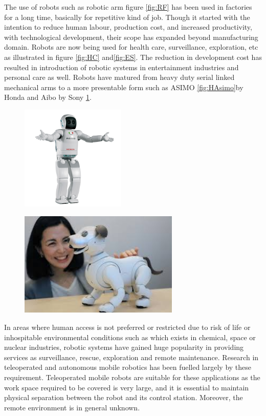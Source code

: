 The use of robots such as robotic arm figure \ref{fig:RF} has been used in factories for a long time, basically for repetitive kind  of job. Though it started with the intention to reduce human labour, production cost, and increased productivity, with technological development,  their scope has expanded beyond  manufacturing domain. Robots are now being used for health care, surveillance, exploration, etc as illustrated in figure \ref{fig:HC} and\ref{fig:ES}. The reduction in development cost  has resulted in introduction of robotic systems in entertainment industries and personal care as well. Robots have matured from heavy duty serial linked mechanical arms to a more presentable form such as ASIMO \ref{fig:HAsimo}by Honda and Aibo by Sony \ref{fig:SA}.  
\begin{figure}
	\centering
	\begin{minipage}{.5\textwidth}
		\centering
		\includegraphics[height=5cm,keepaspectratio]{Chapter1/fig/Honda-Asimo}
		\label{fig:HAsimo}
	\end{minipage}%
	\begin{minipage}{.5\textwidth}
		\centering
		\includegraphics[width=.8\linewidth,height=5cm,keepaspectratio]{Chapter1/fig/aibo}
		\label{fig:SA}
	\end{minipage}
\end{figure}

 In areas where human access is not preferred or restricted  due to risk of life or inhospitable environmental conditions such as which exists in chemical, space or nuclear industries, robotic systems have gained huge popularity in providing services as surveillance, rescue, exploration and remote maintenance.  Research in teleoperated and autonomous mobile robotics has been fuelled largely by these  requirement. Teleoperated mobile robots are suitable for these applications  as the work space required to be covered is very large, and it is essential to maintain  physical separation between the robot and its control station. Moreover, the remote environment is in general unknown. 
 
